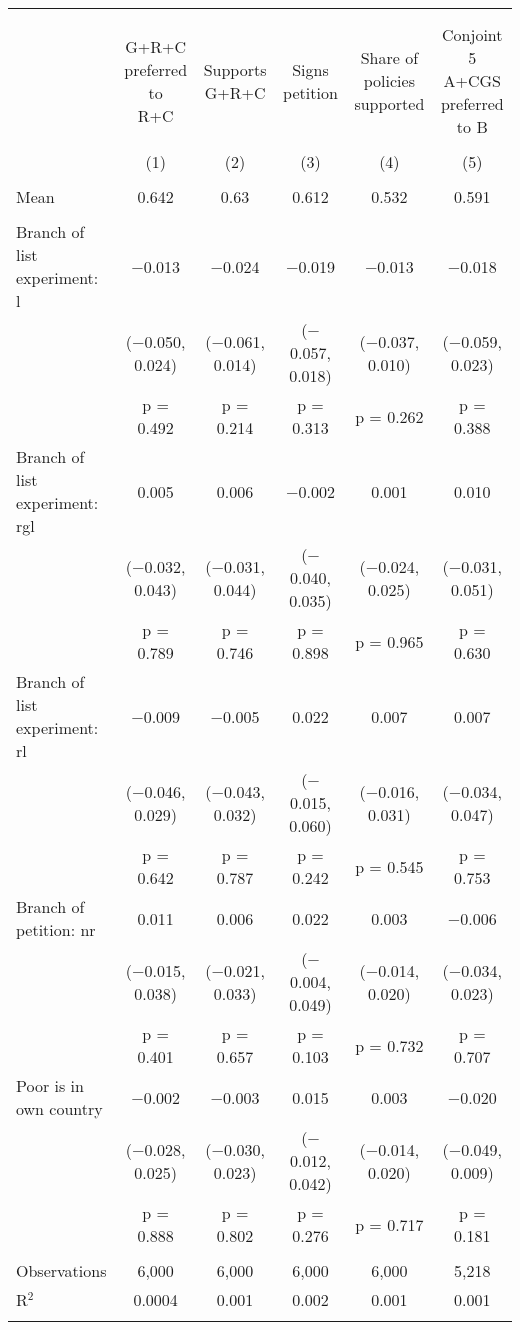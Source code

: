 
\begin{tabular}{@{\extracolsep{5pt}}lccccc} 
\\[-1.8ex]\hline 
\hline \\[-1.8ex] 
\\[-1.8ex] & \makecell{G+R+C\\preferred to\\R+C} & \makecell{Supports\\G+R+C} & \makecell{Signs\\petition} & \makecell{Share of\\policies\\supported} & \makecell{Conjoint 5\\A+CGS\\preferred to B} \\ 
\\[-1.8ex] & (1) & (2) & (3) & (4) & (5)\\ 
\hline \\[-1.8ex] 
Mean & 0.642 & 0.63 & 0.612 & 0.532 & 0.591  \\ \hline \\[-1.8ex]
 Branch of list experiment: l & $-$0.013 & $-$0.024 & $-$0.019 & $-$0.013 & $-$0.018 \\ 
  & ($-$0.050, 0.024) & ($-$0.061, 0.014) & ($-$0.057, 0.018) & ($-$0.037, 0.010) & ($-$0.059, 0.023) \\ 
  & p = 0.492 & p = 0.214 & p = 0.313 & p = 0.262 & p = 0.388 \\ 
  Branch of list experiment: rgl & 0.005 & 0.006 & $-$0.002 & 0.001 & 0.010 \\ 
  & ($-$0.032, 0.043) & ($-$0.031, 0.044) & ($-$0.040, 0.035) & ($-$0.024, 0.025) & ($-$0.031, 0.051) \\ 
  & p = 0.789 & p = 0.746 & p = 0.898 & p = 0.965 & p = 0.630 \\ 
  Branch of list experiment: rl & $-$0.009 & $-$0.005 & 0.022 & 0.007 & 0.007 \\ 
  & ($-$0.046, 0.029) & ($-$0.043, 0.032) & ($-$0.015, 0.060) & ($-$0.016, 0.031) & ($-$0.034, 0.047) \\ 
  & p = 0.642 & p = 0.787 & p = 0.242 & p = 0.545 & p = 0.753 \\ 
  Branch of petition: nr & 0.011 & 0.006 & 0.022 & 0.003 & $-$0.006 \\ 
  & ($-$0.015, 0.038) & ($-$0.021, 0.033) & ($-$0.004, 0.049) & ($-$0.014, 0.020) & ($-$0.034, 0.023) \\ 
  & p = 0.401 & p = 0.657 & p = 0.103 & p = 0.732 & p = 0.707 \\ 
  Poor is in own country & $-$0.002 & $-$0.003 & 0.015 & 0.003 & $-$0.020 \\ 
  & ($-$0.028, 0.025) & ($-$0.030, 0.023) & ($-$0.012, 0.042) & ($-$0.014, 0.020) & ($-$0.049, 0.009) \\ 
  & p = 0.888 & p = 0.802 & p = 0.276 & p = 0.717 & p = 0.181 \\ 
 \hline \\[-1.8ex] 

Observations & 6,000 & 6,000 & 6,000 & 6,000 & 5,218 \\ 
R$^{2}$ & 0.0004 & 0.001 & 0.002 & 0.001 & 0.001 \\ 
\hline 
\hline \\[-1.8ex] 
\end{tabular} 
